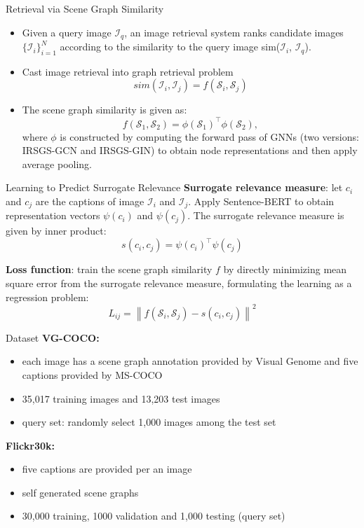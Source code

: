 \documentclass{beamer}
\begin{document}
\begin{frame}{Retrieval via Scene Graph Similarity}
    \begin{itemize}
        \item Given a query image $\mathcal{I}_q$, an image retrieval system ranks candidate images $\{\mathcal{I}_i\}^N_{i=1}$ according to the similarity to the query image sim($\mathcal{I}_i$, $\mathcal{I}_q$).
        \item Cast image retrieval into graph retrieval problem 
        $$sim(\mathcal{I}_i, \mathcal{I}_j)=f(\mathcal{S}_i, \mathcal{S}_j)$$
        \item The scene graph similarity is given as:
        $$f\left(\mathcal{S}_{1}, \mathcal{S}_{2}\right)=\phi\left(\mathcal{S}_{1}\right)^{\top} \phi\left(\mathcal{S}_{2}\right),$$ where $\phi$ is constructed by computing the forward pass of GNNs (two versions: IRSGS-GCN and IRSGS-GIN) to obtain node representations and then apply average pooling.
        
    \end{itemize}
\end{frame}


\begin{frame}{Learning to Predict Surrogate Relevance}
\textbf{Surrogate relevance measure}: let $c_i$ and $c_j$ are the captions of image $\mathcal{I}_i$ and $\mathcal{I}_j$. Apply Sentence-BERT to obtain representation vectors $\psi\left(c_{i}\right)$ and $\psi\left(c_{j}\right)$. The surrogate relevance measure is given by inner product:
$$s(c_i, c_j)=\psi\left(c_{i}\right)^{\top} \psi\left(c_{j}\right)$$

\textbf{Loss function}: train the scene graph similarity $f$ by directly minimizing mean square error from the surrogate relevance measure, formulating the learning as a regression problem: 
$$L_{ij}=\left\|f\left(\mathcal{S}_{i}, \mathcal{S}_{j}\right)-s\left(c_{i}, c_{j}\right)\right\|^{2}$$
\end{frame}


\begin{frame}{Dataset}
\textbf{VG-COCO:}
    \begin{itemize}
        \item each image has a scene graph annotation provided by Visual Genome and five captions provided by MS-COCO
        \item 35,017 training images and 13,203 test images
        \item query set: randomly select 1,000 images among the test set
    \end{itemize}
\textbf{Flickr30k:}
    \begin{itemize}
        \item five captions are provided per an image
        \item self generated scene graphs
        \item 30,000 training, 1000 validation and 1,000 testing (query set)
    \end{itemize}
\end{frame}
\end{document}
